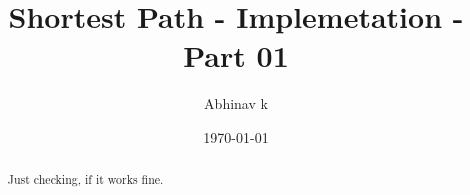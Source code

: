 \documentclass[]{article}
\title{Shortest Path - Implemetation - Part 01}
\author{Abhinav k}
\date{\today}
\begin{document}
\maketitle

\begin{abstract}
	
	Just checking, if it works fine. 

\end{abstract}

\section{}
\end{document}
